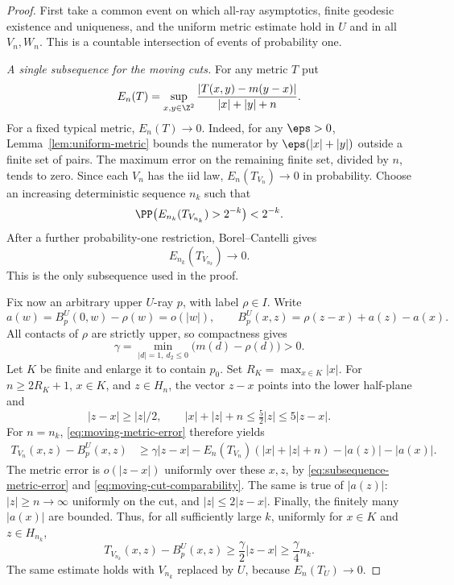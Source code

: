 \begin{proof}
First take a common event on which all-ray asymptotics, finite
geodesic existence and uniqueness, and the uniform metric estimate
hold in $U$ and in all $V_n,W_n$.  This is a countable intersection
of events of probability one.

\emph{A single subsequence for the moving cuts.}
For any metric $T$ put
\begin{equation}
 E_n(T)=\sup_{x,y\in\Z^2}
 \frac{|T(x,y)-m(y-x)|}{|x|+|y|+n}.
 \label{eq:moving-metric-error}
\end{equation}
For a fixed typical metric, $E_n(T)\to0$.  Indeed, for any
$\eps>0$, Lemma~\ref{lem:uniform-metric} bounds the numerator by
$\eps(|x|+|y|)$ outside a finite set of pairs.  The maximum error
on the remaining finite set, divided by $n$, tends to zero.  Since
each $V_n$ has the iid law, $E_n(T_{V_n})\to0$ in probability.
Choose an increasing deterministic sequence $n_k$ such that
\[
 \PP\bigl(E_{n_k}(T_{V_{n_k}})>2^{-k}\bigr)<2^{-k}.
\]
After a further probability-one restriction, Borel--Cantelli gives
\begin{equation}
 E_{n_k}(T_{V_{n_k}})\longrightarrow0.
 \label{eq:subsequence-metric-error}
\end{equation}
This is the only subsequence used in the proof.

Fix now an arbitrary upper $U$-ray $p$, with label $\rho\in I$.
Write
\begin{equation}
 a(w)=B_p^U(0,w)-\rho(w)=o(|w|),\qquad
 B_p^U(x,z)=\rho(z-x)+a(z)-a(x).
 \label{eq:rooted-busemann-error}
\end{equation}
All contacts of $\rho$ are strictly upper, so compactness gives
\begin{equation}
 \gamma=\min_{|d|=1,\ d_2\le0}\bigl(m(d)-\rho(d)\bigr)>0.
 \label{eq:opposite-semicircle-gap}
\end{equation}
Let $K$ be finite and enlarge it to contain $p_0$.  Set
$R_K=\max_{x\in K}|x|$.  For $n\ge2R_K+1$, $x\in K$, and
$z\in H_n$, the vector $z-x$ points into the lower half-plane and
\begin{equation}
 |z-x|\ge |z|/2,\qquad
 |x|+|z|+n\le \tfrac52|z|\le5|z-x|.
 \label{eq:moving-cut-comparability}
\end{equation}
For $n=n_k$, \eqref{eq:moving-metric-error} therefore yields
\begin{align}
 T_{V_n}(x,z)-B_p^U(x,z)
 &\ge \gamma|z-x|
      -E_n(T_{V_n})(|x|+|z|+n)-|a(z)|-|a(x)|.
 \label{eq:moving-cut-barrier-estimate}
\end{align}
The metric error is $o(|z-x|)$ uniformly over these $x,z$, by
\eqref{eq:subsequence-metric-error} and
\eqref{eq:moving-cut-comparability}.  The same is true of $|a(z)|$:
$|z|\ge n\to\infty$ uniformly on the cut, and
$|z|\le2|z-x|$.  Finally, the finitely many $|a(x)|$ are bounded.
Thus, for all sufficiently large $k$, uniformly for $x\in K$ and
$z\in H_{n_k}$,
\begin{equation}
 T_{V_{n_k}}(x,z)-B_p^U(x,z)
 \ge \frac\gamma2|z-x|\ge\frac\gamma4 n_k.
 \label{eq:moving-cut-positive-barrier}
\end{equation}
The same estimate holds with $V_{n_k}$ replaced by $U$, because
$E_n(T_U)\to0$.


\end{proof}
